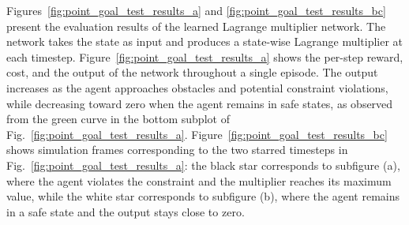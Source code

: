 Figures~\ref{fig:point_goal_test_results_a} and \ref{fig:point_goal_test_results_bc} present the evaluation results of the learned Lagrange multiplier network. 
The network takes the state as input and produces a state-wise Lagrange multiplier at each timestep.
Figure~\ref{fig:point_goal_test_results_a} shows the per-step reward, cost, and the output of the network throughout a single episode.
The output increases as the agent approaches obstacles and potential constraint violations, while decreasing toward zero when the agent remains in safe states, as observed from the green curve in the bottom subplot of Fig.~\ref{fig:point_goal_test_results_a}.
Figure~\ref{fig:point_goal_test_results_bc} shows simulation frames corresponding to the two starred timesteps in Fig.~\ref{fig:point_goal_test_results_a}: the black star corresponds to subfigure (a), where the agent violates the constraint and the multiplier reaches its maximum value, while the white star corresponds to subfigure (b), where the agent remains in a safe state and the output stays close to zero.